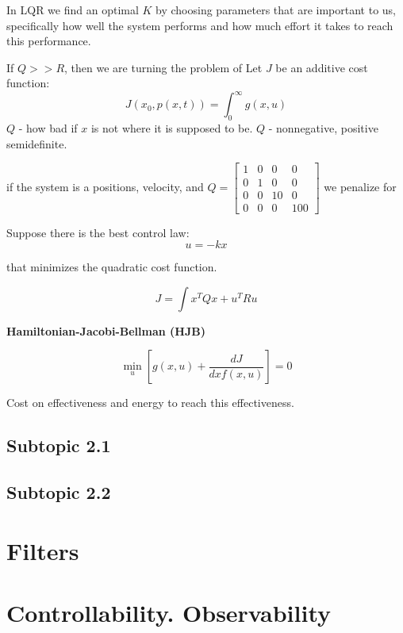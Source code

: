 \documentclass{article}
\begin{document}
In LQR we find an optimal \(K\) by choosing parameters that are important to us, specifically how well the system performs and how much effort it takes to reach this performance.

If \(Q>>R\), then we are turning the problem of 
Let \(J\) be an additive cost function:
\[J(x_0, p(x, t)) = \int_{0}^{\infty} g(x, u)\]
\(Q\) - how bad if \(x\) is not where it is supposed to be.
\(Q\) - nonnegative, positive semidefinite.

if the system is a positions, velocity, and \(Q = \begin{bmatrix} 1 & 0 & 0 & 0 \\ 0 & 1 & 0 & 0 \\ 0 & 0 & 10 & 0 \\ 0 & 0 & 0 & 100 \end{bmatrix}\) we penalize for 

Suppose there is the best control law:
\[u = -kx\]

that minimizes the quadratic cost function.

\[J = \int x^T Q x + u^T R u\]

\textbf{Hamiltonian-Jacobi-Bellman (HJB)}

\[\min_u [g(x, u) + \frac{dJ}{dx f(x, u)}] = 0\]

Cost on effectiveness and energy to reach this effectiveness.

\subsection{Subtopic 2.1}

\subsection{Subtopic 2.2}





\section{Filters}


\section{Controllability. Observability}

\end{document}
